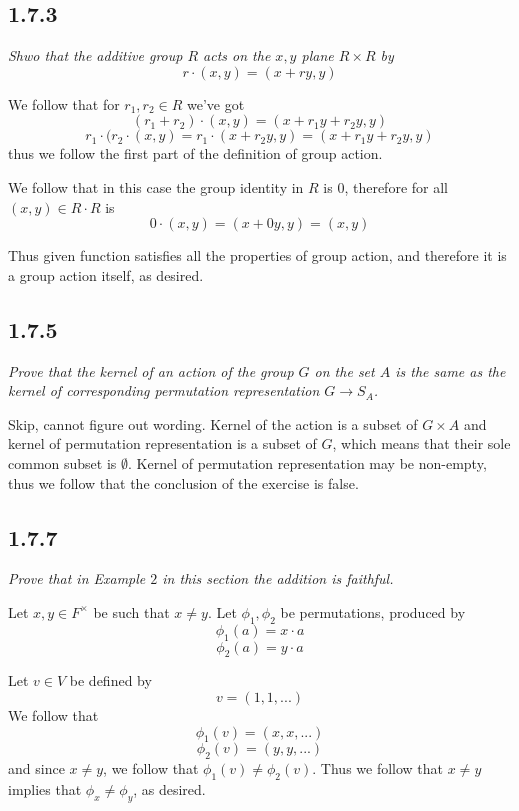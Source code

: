 \documentclass[11pt,oneside,titlepage]{book}
\begin{document}
\subsection*{1.7.3}

\textit{Shwo that the additive group $R$ acts on the $x, y$ plane $R \times R$ by
  $$r \cdot (x, y) = (x + ry, y)$$
}

We follow that for $r_1, r_2 \in R$ we've got 
$$(r_1 + r_2) \cdot (x, y) = (x + r_1y + r_2 y, y)$$
$$r_1 \cdot (r_2 \cdot (x, y) = r_1 \cdot (x + r_2 y, y) = (x + r_1 y + r_2 y, y)$$
thus we follow the first part of the definition of group action.


We follow that in this case the group identity in $R$ is 0, therefore for all
$(x, y) \in R \cdot R$ is 
$$0\cdot (x, y) = (x + 0y, y) = (x, y)$$

Thus given function satisfies all the properties of group action, and therefore
it is a group action itself, as desired.

\subsection*{1.7.5}

\textit{Prove that the kernel of an action of the group $G$ on the set $A$ is the same
  as the kernel of corresponding permutation representation $G \to S_A$.}

Skip, cannot figure out wording. Kernel of the action is a subset of $G \times A$ and
kernel of permutation representation is a subset of $G$, which means that their
sole common subset is $\emptyset$. Kernel of permutation representation may be non-empty,
thus we follow that the conclusion of the exercise is false.

\subsection*{1.7.7}

\textit{Prove that in Example $2$ in this section the addition is faithful.}

Let $x, y \in F^\times$ be such that $x \neq y$. Let $\phi_1, \phi_2$ be permutations, produced
by
$$\phi_1(a) = x \cdot a$$
$$\phi_2(a) = y \cdot a$$

Let $v \in V$ be defined by
$$v = (1, 1, ...)$$
We follow that
$$\phi_1(v) = (x, x, ...)$$
$$\phi_2(v) = (y, y, ...)$$
and since $x \neq y$, we follow that $\phi_1(v) \neq \phi_2(v)$. Thus we follow that
$x \neq y$ implies that $\phi_x \neq \phi_y$, as desired.
\end{document}

